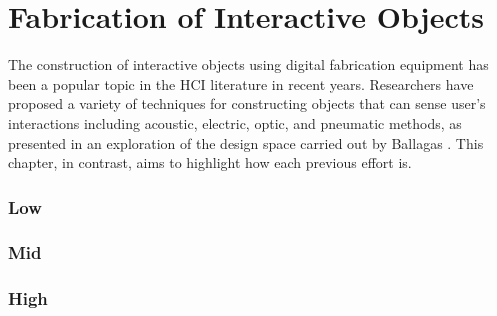 \chapter{Fabrication of Interactive Objects}
  The construction of interactive objects using digital fabrication equipment
  has been a popular topic in the HCI literature in recent years. Researchers
  have proposed a variety of techniques for constructing objects that can sense
  user's interactions including acoustic, electric, optic, and pneumatic
  methods, as presented in an exploration of the design space carried out by
  Ballagas \etal. This chapter, in contrast, aims to highlight how \pap each
  previous effort is.

  \subsection*{Low \pap}
  \subsection*{Mid \pap}
  \subsection*{High \pap}